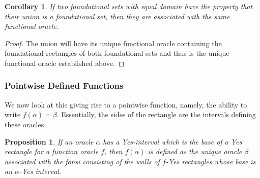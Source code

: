 \documentclass[12pt]{article}
\newtheorem{corollary}{Corollary}[subsection]
\newtheorem{proposition}{Proposition}[subsection]
\begin{document}
\begin{corollary}
    If two foundational sets with equal domain have the property that their union is a foundational set, then they are associated with the same functional oracle. 
\end{corollary}

\begin{proof}
    The union will have its unique functional oracle containing the foundational rectangles of both foundational sets and thus is the unique functional oracle established above. 
\end{proof}


\subsubsection{Pointwise Defined Functions}

We now look at this giving rise to a pointwise function, namely, the ability to write $f(\alpha) = \beta$. Essentially, the sides of the rectangle are the intervals defining these oracles.  

\begin{proposition}
If an oracle $\alpha$ has a Yes-interval which is the base of a Yes rectangle for a function oracle $f$, then $f(\alpha)$ is defined as the unique oracle $\beta$ associated with the fonsi consisting of the walls of $f$-Yes rectangles whose base is an $\alpha$-Yes interval. 
\end{proposition}
\end{document}
